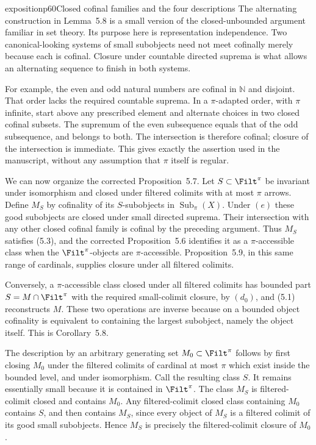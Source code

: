 \begin{dcomment}{exposition}{p60}{Closed cofinal families and the four descriptions}
The alternating construction in Lemma~5.8 is a small version of the closed-unbounded argument familiar in set theory. Its purpose here is representation independence. Two canonical-looking systems of small subobjects need not meet cofinally merely because each is cofinal. Closure under countable directed suprema is what allows an alternating sequence to finish in both systems.

For example, the even and odd natural numbers are cofinal in $\mathbb N$ and disjoint. That order lacks the required countable suprema. In a $\pi$-adapted order, with $\pi$ infinite, start above any prescribed element and alternate choices in two closed cofinal subsets. The supremum of the even subsequence equals that of the odd subsequence, and belongs to both. The intersection is therefore cofinal; closure of the intersection is immediate. This gives exactly the assertion used in the manuscript, without any assumption that $\pi$ itself is regular.

We can now organize the corrected Proposition~5.7. Let $S\subset\Filt^\pi$ be invariant under isomorphism and closed under filtered colimits with at most $\pi$ arrows. Define $M_S$ by cofinality of its $S$-subobjects in $\operatorname{Sub}_{\pi}(X)$. Under $(e)$ these good subobjects are closed under small directed suprema. Their intersection with any other closed cofinal family is cofinal by the preceding argument. Thus $M_S$ satisfies (5.3), and the corrected Proposition~5.6 identifies it as a $\pi$-accessible class when the $\Filt^\pi$-objects are $\pi$-accessible. Proposition~5.9, in this same range of cardinals, supplies closure under all filtered colimits.

Conversely, a $\pi$-accessible class closed under all filtered colimits has bounded part $S=M\cap\Filt^\pi$ with the required small-colimit closure, by $(d_0)$, and (5.1) reconstructs $M$. These two operations are inverse because on a bounded object cofinality is equivalent to containing the largest subobject, namely the object itself. This is Corollary~5.8.

The description by an arbitrary generating set $M_0\subset\Filt^\pi$ follows by first closing $M_0$ under the filtered colimits of cardinal at most $\pi$ which exist inside the bounded level, and under isomorphism. Call the resulting class $S$. It remains essentially small because it is contained in $\Filt^\pi$. The class $M_S$ is filtered-colimit closed and contains $M_0$. Any filtered-colimit closed class containing $M_0$ contains $S$, and then contains $M_S$, since every object of $M_S$ is a filtered colimit of its good small subobjects. Hence $M_S$ is precisely the filtered-colimit closure of $M_0$.


\end{dcomment}
